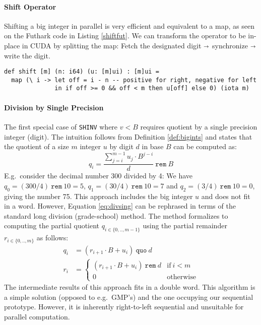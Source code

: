 \paragraph{Shift Operator}
Shifting a big integer in parallel is very efficient and equivalent to a map, as
seen on the Futhark code in Listing \ref{shiftfut}. We can transform the
operator to be in-place in CUDA by splitting the map: Fetch the designated digit
$\shortrightarrow$ synchronize $\shortrightarrow$ write the digit.
\begin{lstlisting}[language=futhark,caption={\footnotesize Shift operator (Definition \ref{def:shifts}) in Futhark from file \texttt{helper.fut}.},firstnumber=96,label={shiftfut}]
def shift [m] (n: i64) (u: [m]ui) : [m]ui =
  map (\ i -> let off = i - n -- positive for right, negative for left
              in if off >= 0 && off < m then u[off] else 0) (iota m)
\end{lstlisting}

\paragraph{Division by Single Precision}
The first special case of \texttt{SHINV} where $v<B$ requires quotient by a
single precision integer (digit). The intuition follows from Definition
\ref{def:bigints} and states that the quotient of a size $m$ integer $u$ by
digit $d$ in base $B$ can be computed as:
\begin{equation}
  \label{eq:divsing}
  q_i = \dfrac{\sum_{j=i}^{m-1} u_j \cdot B^{j-i}}{d}~ \mathtt{rem}~ B
\end{equation}
E.g.\ consider the decimal number 300 divided by 4: We have
$q_0 = (300 / 4)~ \mathtt{rem}~ 10 = 5$, $q_1 = (30 / 4)~ \mathtt{rem}~ 10 = 7$
and $q_2 = (3 / 4)~\mathtt{rem}~10 = 0$, giving the number 75. This approach
includes the big integer $u$ and does not fit in a word. However, Equation
\ref{eq:divsing} can be rephrased in terms of the standard long division
(grade-school) method. The method formalizes to computing the partial quotient
$q_{i\in\{0,..,m-1\}}$ using the partial remainder $r_{i\in\{0,..,m\}}$ as follows:
\begin{align}
  q_i &= \left( r_{i+1} \cdot B + u_i\right)~ \mathtt{quo}~ d\\
  r_i &= \begin{cases} \left( r_{i+1} \cdot B + u_i\right)~ \mathtt{rem}~d & \text{if}~i<m \\ 0 & \text{otherwise} \end{cases}
\end{align}
The intermediate results of this approach fits in a double word. This algorithm
is a simple solution (opposed to e.g.\ GMP's) and the one occupying our
sequential prototype. However, it is inherently right-to-left
sequential and unsuitable for parallel computation.

